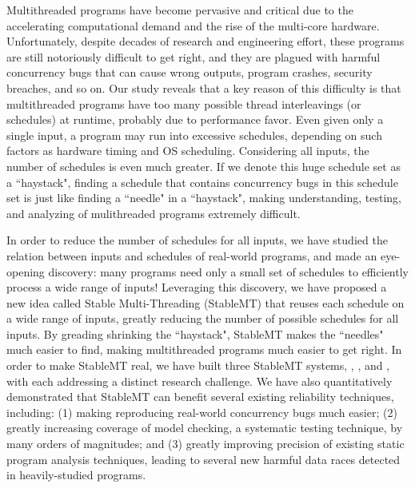 Multithreaded programs have become pervasive and critical due to the
accelerating computational demand and the rise of the
multi-core hardware. Unfortunately, despite decades of research and engineering
effort, these programs are still notoriously difficult to get right, and they
are plagued with harmful concurrency bugs that can cause wrong outputs, program
crashes, security breaches, and so on. Our study reveals that a key reason of
this difficulty is that multithreaded programs have too many possible thread
interleavings (or schedules) at runtime, probably due to performance favor. Even
given only a single input, a program may run into excessive schedules, depending
on such factors as hardware timing and OS scheduling. Considering all inputs,
the number of schedules is even much greater. If we denote this huge schedule
set as a ``haystack", finding a schedule that contains concurrency bugs in this
schedule set is just like finding a ``needle" in a ``haystack", making
understanding, testing, and analyzing of mulithreaded programs extremely
difficult.

In order to reduce the number of schedules for all inputs, we have studied the
relation between inputs and schedules of real-world programs, and made an
eye-opening discovery: many programs need only a small set of schedules to
efficiently process a wide range of inputs! Leveraging this discovery, we have
proposed a new idea called Stable Multi-Threading (StableMT) that reuses each
schedule on a wide range of inputs, greatly reducing the number of possible
schedules for all inputs. By greading shrinking the ``haystack", StableMT makes
the ``needles" much easier to find, making multithreaded programs much easier to
get right. In order to make StableMT real, we have built three StableMT systems,
\tern, \peregrine, and \parrot, with each addressing a distinct research
challenge. We have also quantitatively demonstrated that StableMT can benefit
several existing reliability techniques, including: (1) making reproducing
real-world concurrency bugs much easier; (2) greatly increasing coverage of
model checking, a systematic testing technique, by many orders of magnitudes;
and (3) greatly improving precision of existing static program analysis
techniques, leading to several new harmful data races detected in
heavily-studied programs.

